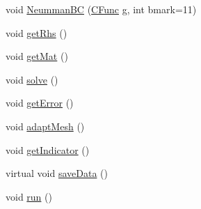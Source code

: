 \begin{DoxyCompactItemize}
\item 
void \mbox{\hyperlink{classui_experiment_afd027bbfa6350cfb77a0208721c56ebe}{Neumman\+BC}} (\mbox{\hyperlink{complex__node___t_h_f_e_m_2emdefs_8h_af8816f473dfdd972d676674921eb65f3}{C\+Func}} g, int bmark=11)
\item 
void \mbox{\hyperlink{classui_experiment_a1c015a570ae4f2a1c8db01275497753f}{get\+Rhs}} ()
\item 
void \mbox{\hyperlink{classui_experiment_ad09537c271da486d93b126d06e31dd2f}{get\+Mat}} ()
\item 
void \mbox{\hyperlink{classui_experiment_a542aa9e02b2ff7f40975ecce7b00a304}{solve}} ()
\item 
void \mbox{\hyperlink{classui_experiment_a4a8beb61cd0e3061d9be1273c371cadf}{get\+Error}} ()
\item 
void \mbox{\hyperlink{classui_experiment_ab560aa75b58cc9bba585adf8f6ce7d76}{adapt\+Mesh}} ()
\item 
void \mbox{\hyperlink{classui_experiment_aa01307f80d55f23738cd9ae0876280b3}{get\+Indicator}} ()
\item 
virtual void \mbox{\hyperlink{classui_experiment_a1b08fa8cc473ac030f73bcc46048cf45}{save\+Data}} ()
\item 
void \mbox{\hyperlink{classui_experiment_aab82b5571ffb6a05e3104b7fc50ca34a}{run}} ()
\end{DoxyCompactItemize}
